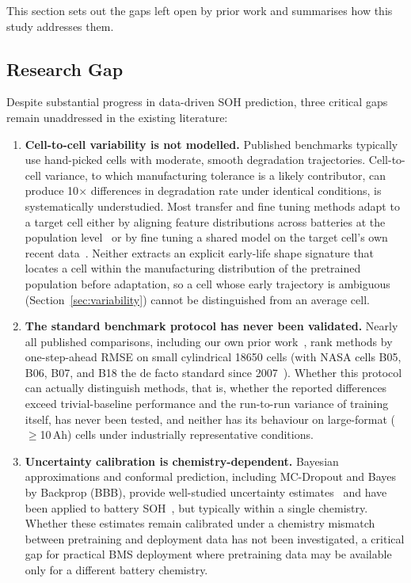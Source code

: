 This section sets out the gaps left open by prior work and summarises how this
study addresses them.

\subsection{Research Gap}

Despite substantial progress in data-driven SOH prediction, three critical gaps remain unaddressed in the existing literature:

\begin{enumerate}
  \item \textbf{Cell-to-cell variability is not modelled.}
        Published benchmarks typically use hand-picked cells with moderate,
        smooth degradation trajectories.
        Cell-to-cell variance, to which manufacturing tolerance is a likely
        contributor, can produce 10$\times$
        differences in degradation rate under identical conditions, is
        systematically understudied.
        Most transfer and fine tuning methods adapt to a target cell either by
        aligning feature distributions across batteries at the population
        level~\cite{ye2021state} or by fine tuning a shared model on the target
        cell's own recent data~\cite{ma2022real}.
        Neither extracts an explicit early-life shape signature that locates a
        cell within the manufacturing distribution of the pretrained population
        before adaptation, so a cell whose early trajectory is ambiguous
        (Section~\ref{sec:variability}) cannot be distinguished from an average
        cell.

  \item \textbf{The standard benchmark protocol has never been validated.}
        Nearly all published comparisons, including our own prior
        work~\cite{ponnambalam2024battery,ponnambalam2026delstm}, rank methods
        by one-step-ahead RMSE on small cylindrical 18650 cells (with NASA cells
        B05, B06, B07, and B18 the de facto standard since
        2007~\cite{saha2007battery,xu2025review}).
        Whether this protocol can actually distinguish methods, that is,
        whether the reported differences exceed trivial-baseline performance
        and the run-to-run variance of training itself, has never been
        tested, and neither has its behaviour on large-format
        ($\geq$10\,Ah) cells under industrially representative conditions.

  \item \textbf{Uncertainty calibration is chemistry-dependent.}
        Bayesian approximations and conformal prediction, including MC-Dropout
        and Bayes by Backprop (BBB), provide well-studied uncertainty
        estimates~\cite{gal2016dropout,angelopoulos2021gentle} and have been
        applied to battery SOH~\cite{ke2024bayesian}, but typically within a
        single chemistry.
        Whether these estimates remain calibrated under a chemistry mismatch
        between pretraining and deployment data has not been investigated, a
        critical gap for practical BMS deployment where pretraining data may be
        available only for a different battery chemistry.
\end{enumerate}


